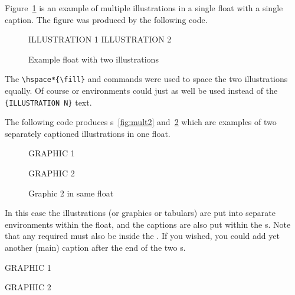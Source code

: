     Figure~\ref{fig:mult1} is an example of multiple 
illustrations in a single float 
with a single caption. The figure was produced by the following code.
 \begin{lcode}
 \begin{figure}
 \centering
 \hspace*{\fill} 
   {ILLUSTRATION 1} \hfill {ILLUSTRATION 2} 
 \hspace*{\fill}
 \caption{Example float with two illustrations} \label{fig:mult1}
 \end{figure}
 \end{lcode}
 The \verb?\hspace*{\fill}? and \cmd{\hfill} commands were used to 
space the two illustrations equally. Of course 
or  environments could just as well be used instead of the 
\verb?{ILLUSTRATION N}? text.

    The following code produces \figurerefname s~\ref{fig:mult2} 
and~\ref{fig:mult3} which are examples of two separately 
captioned
illustrations in one float.
 \begin{lcode}
 \begin{figure}
 \centering
 \begin{minipage}{0.4\textwidth}
   \centering
   GRAPHIC 1
   \caption{Graphic 1 in a float} \label{fig:mult2}
 \end{minipage} 
 \hfill
 \begin{minipage}{0.4\textwidth}
   \centering
   GRAPHIC 2
   \caption{Graphic 2 in same float} \label{fig:mult3}
 \end{minipage} 
 \end{figure}
 \end{lcode}
 In this case the illustrations (or graphics or 
tabulars) are put into separate  
environments within the float, 
and the captions are also put within the s. Note that 
any required \cmd{\label} must also be inside the . 
If you wished, you could add yet another (main) caption after the end 
of the two s.

 \begin{shadefigure}
 \centering
 \begin{minipage}{0.4\textwidth}
   \centering
   GRAPHIC 1
   \caption{Graphic 1 in a float} \label{fig:mult2}
 \end{minipage} 
 \hfill
 \begin{minipage}{0.4\textwidth}
   \centering
   GRAPHIC 2
   \caption{Graphic 2 in same float} \label{fig:mult3}
 \end{minipage} 
 \end{shadefigure}

